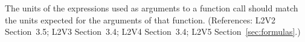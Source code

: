 The units of the expressions used as arguments to a function call
should match the units expected for the arguments of that function.
(References: L2V2 Section~3.5; L2V3 Section~3.4; L2V4 Section~3.4; L2V5 Section~\ref{sec:formulas}.)
